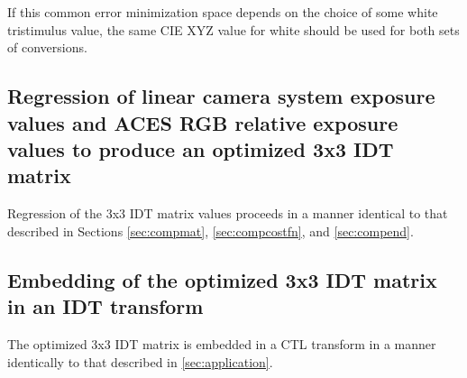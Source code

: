 If this common error minimization space depends on the choice of some white tristimulus value, the same CIE XYZ value for white should be used for both sets of conversions. 

\subsection*{Regression of linear camera system exposure values and ACES RGB relative exposure values to produce an optimized 3x3 IDT matrix}

Regression of the 3x3 IDT matrix values proceeds in a manner identical to that described in Sections \ref{sec:compmat}, \ref{sec:compcostfn}, and \ref{sec:compend}.

\subsection*{Embedding of the optimized 3x3 IDT matrix in an IDT transform}
The optimized 3x3 IDT matrix is embedded in a CTL transform in a manner identically to that described in \autoref{sec:application}.
